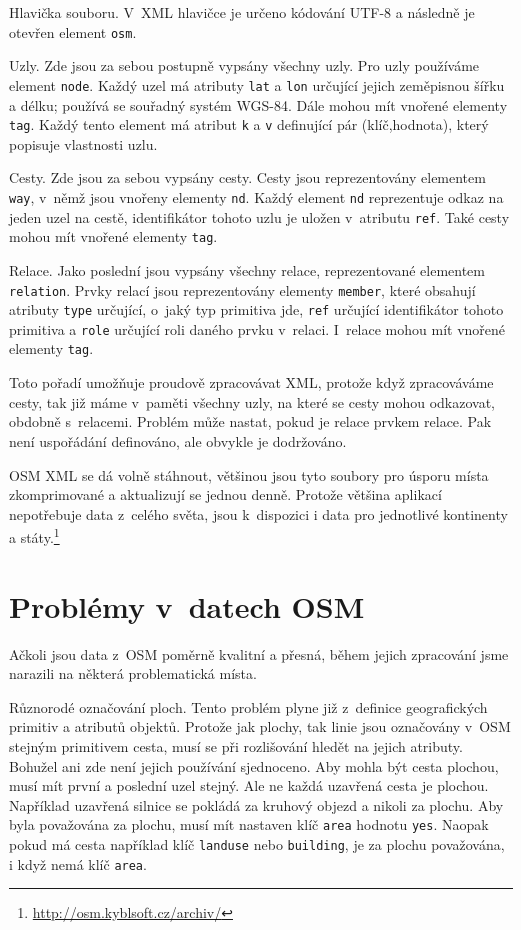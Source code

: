{\tuc Hlavička souboru.} V~XML hlavičce je určeno kódování UTF-8 a následně je
otevřen element \verb|osm|. 

{\tuc Uzly.} Zde jsou za sebou postupně vypsány všechny uzly.  Pro uzly
používáme element \verb|node|. Každý uzel má atributy \verb|lat| a \verb|lon|
určující jejich zeměpisnou šířku a délku; používá se souřadný systém
WGS-84. \cite{wgsnorma} Dále mohou mít vnořené elementy \verb|tag|. Každý tento
element má atribut \verb|k| a \verb|v| definující pár (klíč,hodnota), který
popisuje vlastnosti uzlu.

{\tuc Cesty.} Zde jsou za sebou vypsány cesty. Cesty jsou reprezentovány
elementem \verb|way|, v~němž jsou vnořeny elementy \verb|nd|. Každý element
\verb|nd| reprezentuje odkaz na jeden uzel na cestě, identifikátor tohoto uzlu
je uložen v~atributu \verb|ref|. Také cesty mohou mít vnořené elementy
\verb|tag|.

{\tuc Relace.} Jako poslední jsou vypsány všechny relace, reprezentované
elementem \verb|relation|. Prvky relací jsou reprezentovány elementy
\verb|member|, které obsahují atributy \verb|type| určující, o~jaký typ
primitiva jde, \verb|ref| určující identifikátor tohoto primitiva a \verb|role|
určující roli daného prvku v~relaci. I~relace mohou mít vnořené elementy
\verb|tag|.

Toto pořadí umožňuje proudově zpracovávat XML, protože když zpracováváme cesty,
tak již máme v~paměti všechny uzly, na které se cesty mohou odkazovat, obdobně
s~relacemi. Problém může nastat, pokud je relace prvkem relace. Pak není
uspořádání definováno, ale obvykle je dodržováno. 

OSM XML se dá volně stáhnout, většinou jsou tyto soubory pro úsporu místa
zkomprimované a aktualizují se jednou denně. Protože většina aplikací
nepotřebuje data z~celého světa, jsou k~dispozici i data pro jednotlivé
kontinenty a státy.\footnote{\url{http://osm.kyblsoft.cz/archiv/}}

\section{Problémy v~datech OSM}
Ačkoli jsou data z~OSM poměrně kvalitní a přesná, během jejich zpracování jsme
narazili na některá problematická místa. 

{\tuc Různorodé označování ploch.} Tento problém plyne již z~definice geografických
primitiv a atributů objektů. Protože jak plochy, tak linie jsou označovány v~OSM
stejným primitivem cesta, musí se při rozlišování hledět na jejich atributy.
Bohužel ani zde není jejich používání sjednoceno. Aby mohla být cesta
plochou, musí mít první a poslední uzel stejný. Ale ne každá uzavřená 
cesta je plochou. Například uzavřená silnice se pokládá za kruhový objezd a
nikoli za plochu. Aby byla považována za plochu, musí mít nastaven klíč
\verb|area| hodnotu \verb|yes|. Naopak pokud má cesta například klíč \verb|landuse|
nebo \verb|building|, je za plochu považována, i když nemá klíč \verb|area|.

